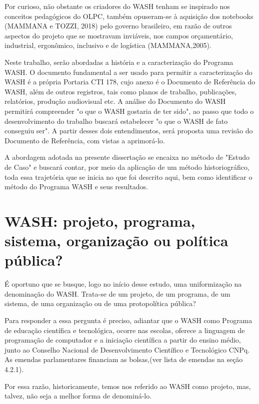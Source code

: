 Por curioso, não obstante os criadores do WASH tenham se inspirado nos conceitos pedagógicos do OLPC, também opuseram-se à aquisição dos notebooks (MAMMANA e TOZZI, 2018) pelo governo brasileiro, em razão de outros aspectos do projeto que se mostravam inviáveis, nos campos orçamentário, industrial, ergonômico, inclusivo e de logística (MAMMANA,2005).

Neste trabalho, serão abordadas a história e a caracterização do Programa WASH. O documento fundamental a ser usado para permitir a caracterização do WASH é a própria Portaria CTI 178, cujo anexo é o Documento de Referência do WASH, além de outros registros, tais como planos de trabalho, publicações, relatórios,  produção audiovisual etc.  A análise do Documento do WASH permitirá compreender "o que o WASH gostaria de ter sido", ao passo que todo o desenvolvimento do trabalho buscará estabelecer "o que o WASH de fato conseguiu ser". A partir desses dois entendimentos, será proposta uma revisão do Documento de Referência, com vistas a aprimorá-lo.

A abordagem adotada na presente dissertação se encaixa no método de "Estudo de Caso"  e buscará contar, por meio da aplicação de um método historiográfico, toda essa trajetória que se inicia no que foi descrito aqui, bem como identificar o método do Programa WASH e seus resultados.

\section[WASH: projeto, programa, sistema, organização ou política pública?]{WASH: projeto, programa, sistema, organização ou política pública?}\label{WASH: projeto, programa, sistema, organização ou política pública?}
É oportuno que se busque, logo no início desse estudo, uma uniformização na denominação do WASH. Trata-se de um projeto, de um programa, de um sistema, de uma organização ou de uma protopolítica pública?

Para responder a essa pergunta é preciso, adiantar que o WASH 
como Programa de educação científica e tecnológica, ocorre nas escolas, oferece a linguagem de programação de computador e a iniciação científica a partir do  ensino médio, junto ao Conselho Nacional de Desenvolvimento Científico e Tecnológico CNPq. As emendas parlamentares financiam as bolsas,(ver  lista de emendas na seção 4.2.1).

Por essa razão, historicamente, temos nos referido ao WASH como projeto, mas, talvez, não seja a melhor forma de denominá-lo.

